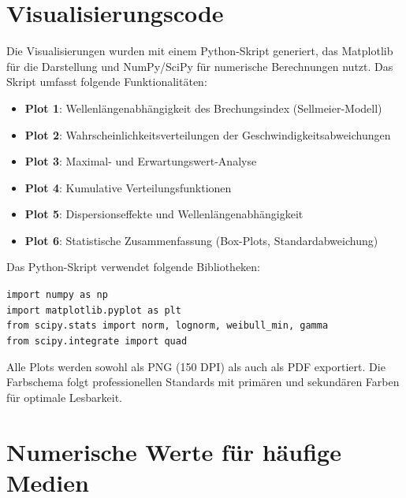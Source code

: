 \documentclass[a4paper,12pt]{article}
\theoremstyle{definition}
\theoremstyle{remark}
\begin{document}
\appendix

\section{Visualisierungscode}

Die Visualisierungen wurden mit einem Python-Skript generiert, das Matplotlib für die Darstellung und NumPy/SciPy für numerische Berechnungen nutzt. Das Skript umfasst folgende Funktionalitäten:

\begin{itemize}
    \item \textbf{Plot 1}: Wellenlängenabhängigkeit des Brechungsindex (Sellmeier-Modell)
    \item \textbf{Plot 2}: Wahrscheinlichkeitsverteilungen der Geschwindigkeitsabweichungen
    \item \textbf{Plot 3}: Maximal- und Erwartungswert-Analyse
    \item \textbf{Plot 4}: Kumulative Verteilungsfunktionen
    \item \textbf{Plot 5}: Dispersionseffekte und Wellenlängenabhängigkeit
    \item \textbf{Plot 6}: Statistische Zusammenfassung (Box-Plots, Standardabweichung)
\end{itemize}

Das Python-Skript verwendet folgende Bibliotheken:

\texttt{import numpy as np}\\
\texttt{import matplotlib.pyplot as plt}\\
\texttt{from scipy.stats import norm, lognorm, weibull\_min, gamma}\\
\texttt{from scipy.integrate import quad}

Alle Plots werden sowohl als PNG (150 DPI) als auch als PDF exportiert. Die Farbschema folgt professionellen Standards mit primären und sekundären Farben für optimale Lesbarkeit.

\section{Numerische Werte für häufige Medien}
\end{document}
